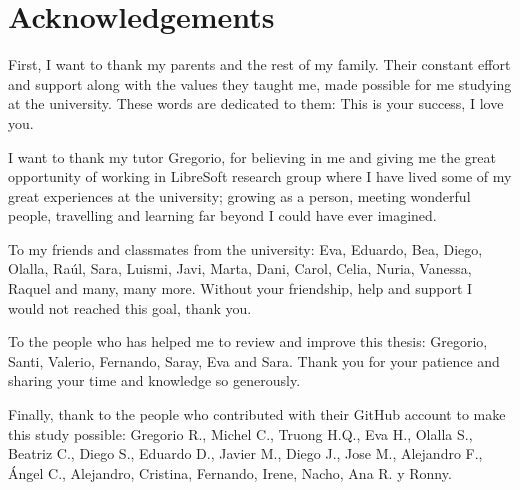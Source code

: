 \documentclass[a4paper, 12pt]{book}
\begin{document}
\chapter*{Acknowledgements}

First, I want to thank my parents and the rest of my family. Their constant effort and support
along with the values they taught me, made possible for me studying at the university. These words
are dedicated to them: This is your success, I love you.\par
I want to thank my tutor Gregorio, for believing in me and giving me the great opportunity of working
in LibreSoft research group where I have lived some of my great experiences at the university;
growing as a person, meeting wonderful people, travelling and learning far beyond I could have ever imagined.\par
To my friends and classmates from the university: Eva, Eduardo, Bea, Diego, Olalla, Raúl, Sara, Luismi, Javi, Marta, Dani, Carol,
Celia, Nuria, Vanessa, Raquel and many, many more. Without your friendship, help and support I would not reached this goal, thank you.\par
To the people who has helped me to review and improve this thesis: Gregorio, Santi, Valerio, Fernando, Saray, Eva and Sara. Thank you
for your patience and sharing your time and knowledge so generously.\par
Finally, thank to the people who contributed with their GitHub account to make this study possible:
Gregorio R., Michel C., Truong H.Q., Eva H., Olalla S., Beatriz C., Diego S.,
Eduardo D., Javier M., Diego J., Jose M., Alejandro F., Ángel C., Alejandro, Cristina, Fernando, Irene, Nacho, Ana R. y Ronny.
\end{document}

